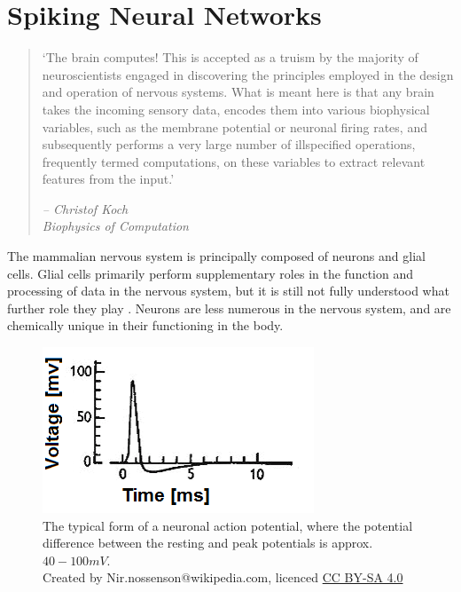 \section{Spiking Neural Networks}

\begin{quote}
    `The brain computes! This is accepted as a truism by the majority
    of neuroscientists engaged in discovering the principles employed in the
    design and operation of nervous systems. What is meant here is that any
    brain takes the incoming sensory data, encodes them into various biophysical
    variables, such as the membrane potential or neuronal firing rates, and
    subsequently performs a very large number of illspecified operations,
    frequently termed computations, on these variables to extract relevant
    features from the input.'
    \begin{flushright}
        \textit{-- Christof Koch \\ Biophysics of Computation}
    \end{flushright}
\end{quote}

The mammalian nervous system is principally composed of neurons and glial cells.
Glial cells primarily perform supplementary roles in the function and processing
of data in the nervous system, but it is still not fully understood what further
role they play \autocite{walz_role_1989}. Neurons are less numerous in the
nervous system, and are chemically unique in their functioning in the body.

\begin{figure}[t]
    \centering
    \includegraphics{figures/graphs/huxhog_spike.png}
    \caption[The typical form of a neuronal action potential]{The typical form
    of a neuronal action potential, where the potential difference between the
    resting and peak potentials is approx. $40-100 mV$.
        \\\small{Created by
    Nir.nossenson@wikipedia.com, licenced 
            \href{https://creativecommons.org/licenses/by-sa/4.0/deed.en}{CC BY-SA 4.0}}}
    \label{neuronalactionpotentialexample}
\end{figure}
\vspace{1ex}

